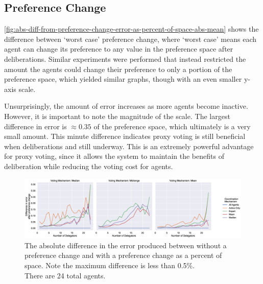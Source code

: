 \subsection{Preference Change}\label{subsec:results-shift}
\autoref{fig:abs-diff-from-preference-change-error-as-percent-of-space-abs-mean} shows
the difference between `worst case' preference change, where `worst case' means each
agent can change its preference to any value in the preference space after
deliberations.  
Similar experiments were performed that instead restricted the amount the agents
could change their preference to only a portion of the preference space, which
yielded similar graphs, though with an even smaller y-axis scale.

Unsurprisingly, the amount of error increases as more agents become inactive.
However, it is important to note the magnitude of the scale.
The largest difference in error is $\approx 0.35$ of the preference space,
which ultimately is a very small amount.
This minute difference indicates proxy voting is still beneficial when deliberations
and still underway.
This is an extremely powerful advantage for proxy voting, since it allows the system
to maintain the benefits of deliberation while reducing the voting cost for agents.
\begin{landscape}
    \begin{figure}[p]
        \centering
        \includegraphics[scale=0.55]
        {content/chapter2/figures/abs_diff_from_preference_change_error_as_percent_of_space_abs_mean}
        \caption{
            The absolute difference in the error produced between without a
            preference change and with a preference change as a percent of space.
            Note the maximum difference is less than 0.5\%.
            \\
            There are 24 total agents.
        }
        \label{fig:abs-diff-from-preference-change-error-as-percent-of-space-abs-mean}
    \end{figure}
\end{landscape}

